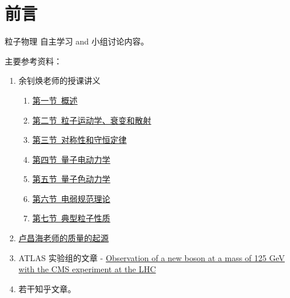 \chapter{前言}

粒子物理 自主学习 and 小组讨论内容。

主要参考资料：

\begin{enumerate}
    \item 余钊焕老师的授课讲义
        \begin{enumerate}
            \item \href{https://yzhxxzxy.github.io/teaching/2109_PartPhys_sec1_intro.pdf}{第一节\ 概述}
            \item \href{https://yzhxxzxy.github.io/teaching/2109_PartPhys_sec2_kin.pdf}{第二节\ 粒⼦运动学、衰变和散射}
            \item \href{https://yzhxxzxy.github.io/teaching/2109_PartPhys_sec3_sym.pdf}{第三节\ 对称性和守恒定律}
            \item \href{https://yzhxxzxy.github.io/teaching/2109_PartPhys_sec4_QED.pdf}{第四节\ 量子电动力学}
            \item \href{https://yzhxxzxy.github.io/teaching/2109_PartPhys_sec5_QCD.pdf}{第五节\ 量子色动力学}
            \item \href{https://yzhxxzxy.github.io/teaching/2109_PartPhys_sec6_EW.pdf}{第六节\ 电弱规范理论}
            \item \href{https://yzhxxzxy.github.io/teaching/2109_PartPhys_sec7_part.pdf}{第七节\ 典型粒子性质}
        \end{enumerate}
    \item \href{https://www.changhai.org/articles/science/physics/origin_of_mass/}{卢昌海老师的质量的起源}
    \item ATLAS 实验组的文章 - \href{https://inspirehep.net/literature/1124338}{Observation of a new boson at a mass of 125 GeV with the CMS experiment at the LHC}
    \item 若干知乎文章。
\end{enumerate}
